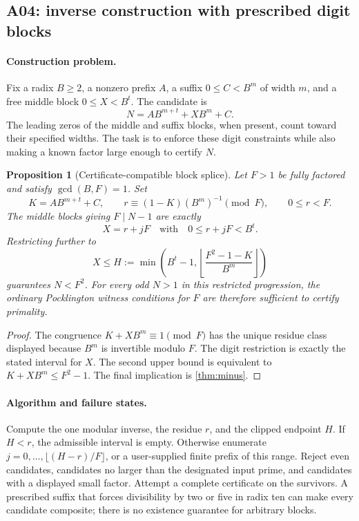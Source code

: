 \documentclass[11pt,a4paper]{article}
\newtheorem{proposition}[theorem]{Proposition}
\theoremstyle{definition}\newtheorem{definition}[theorem]{Definition}
\theoremstyle{remark}\newtheorem{remark}[theorem]{Remark}
\begin{document}
\subsection{A04: inverse construction with prescribed digit blocks}
\label{sec:a04}

\paragraph{Construction problem.}
Fix a radix $B\ge2$, a nonzero prefix $A$, a suffix $0\le C<B^m$ of
width $m$, and a free middle block $0\le X<B^t$. The candidate is
\begin{equation}\label{eq:a04-block}
 N=A B^{m+t}+X B^m+C.
\end{equation}
The leading zeros of the middle and suffix blocks, when present, count
toward their specified widths. The task is to enforce these digit constraints
while also making a known factor large enough to certify $N$.

\begin{proposition}[Certificate-compatible block splice]\label{prop:a04}
Let $F>1$ be fully factored and satisfy $\gcd(B,F)=1$. Set
\[
 K=A B^{m+t}+C,
 \qquad r\equiv(1-K)(B^m)^{-1}\pmod F,
 \qquad 0\le r<F.
\]
The middle blocks giving $F\mid N-1$ are exactly
\[
 X=r+jF\quad\text{with}\quad0\le r+jF<B^t.
\]
Restricting further to
\begin{equation}\label{eq:a04-limit}
 X\le H:=\min\left(B^t-1,
 \left\lfloor\frac{F^2-1-K}{B^m}\right\rfloor\right)
\end{equation}
guarantees $N<F^2$. For every odd $N>1$ in this restricted progression,
the ordinary Pocklington witness conditions for $F$ are therefore sufficient
to certify primality.
\end{proposition}
\begin{proof}
The congruence $K+XB^m\equiv1\pmod F$ has the unique residue class
displayed because $B^m$ is invertible modulo $F$. The digit restriction
is exactly the stated interval for $X$. The second upper bound is
equivalent to $K+XB^m\le F^2-1$. The final implication is
\cref{thm:minus}.
\end{proof}

\paragraph{Algorithm and failure states.}
Compute the one modular inverse, the residue $r$, and the clipped endpoint
$H$. If $H<r$, the admissible interval is empty. Otherwise enumerate
$j=0,\ldots,\lfloor(H-r)/F\rfloor$, or a user-supplied finite prefix
of this range. Reject even candidates, candidates no larger than the
designated input prime, and candidates with a displayed small factor.
Attempt a complete certificate on the survivors. A prescribed suffix that
forces divisibility by two or five in radix ten can make every candidate
composite; there is no existence guarantee for arbitrary blocks.
\end{document}
